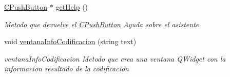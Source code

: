 \begin{DoxyCompactItemize}
\hyperlink{classCPushButton}{C\+Push\+Button} $\ast$ \hyperlink{classCAsistenteCodificacion_adf9ae1bf08b445fb095246b95b723450}{get\+Help} ()
\begin{DoxyCompactList}\small\item\em Metodo que devuelve el \hyperlink{classCPushButton}{C\+Push\+Button} Ayuda sobre el asistente. \end{DoxyCompactList}\item 
void \hyperlink{classCAsistenteCodificacion_a8d5a01cef945d9a6b72dd54a9aaecec2}{ventana\+Info\+Codificacion} (string text)
\begin{DoxyCompactList}\small\item\em ventana\+Info\+Codificacion Metodo que crea una ventana Q\+Widget con la informacion resultado de la codificacion \end{DoxyCompactList}\end{DoxyCompactItemize}
